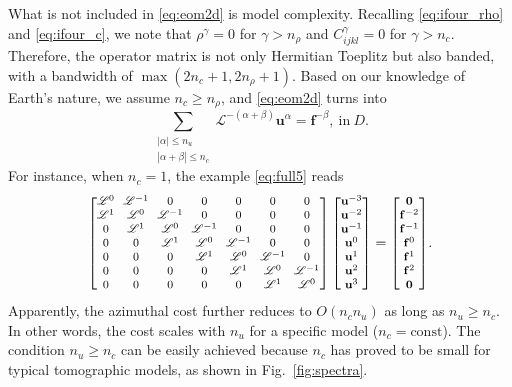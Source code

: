 \documentclass[extra,referee]{gji}
\begin{document}
What is not included in \eqref{eq:eom2d} is model complexity. 
Recalling \eqref{eq:ifour_rho} and \eqref{eq:ifour_c}, 
we note that $\rho^\gamma=0$ for $\gamma>n_\rho$ and 
$C_{ijkl}^\gamma=0$ for $\gamma>n_c$.
Therefore, the operator matrix is not only Hermitian Toeplitz 
but also banded, with a bandwidth of $\max\left(2n_c+1,2n_\rho+1\right)$. 
Based on our knowledge of Earth's nature, we assume $n_c\ge n_\rho$, 
and \eqref{eq:eom2d} turns into
\begin{equation}
  \sum_{\substack{|\alpha|\le n_u\\|\alpha+\beta|\le n_c}}
  \mathscr{L}^{-\left(\alpha+\beta\right)}\mathbf{u}^\alpha=\mathbf{f}^{-\beta},
  \ \text{in}\ D.
  \label{eq:band2d}
\end{equation}
For instance, when $n_c=1$, the example \eqref{eq:full5} reads
\begin{equation}
  {\footnotesize
  \setlength{\arraycolsep}{3pt}
  \begin{bmatrix}
  \mathscr{L}^{0} & \mathscr{L}^{-1} & 0 & 0 & 0 & 0 & 0\\
  \mathscr{L}^{1} & \mathscr{L}^{0} & \mathscr{L}^{-1} & 0 & 0 & 0 & 0\\
  0 & \mathscr{L}^{1} & \mathscr{L}^{0} & \mathscr{L}^{-1} & 0 & 0 & 0\\
  0 & 0 & \mathscr{L}^{1} & \mathscr{L}^{0} & \mathscr{L}^{-1} & 0 & 0\\
  0 & 0 & 0 & \mathscr{L}^{1} & \mathscr{L}^{0} & \mathscr{L}^{-1} & 0\\
  0 & 0 & 0 & 0 & \mathscr{L}^{1} & \mathscr{L}^{0} & \mathscr{L}^{-1}\\
  0 & 0 & 0 & 0 & 0 & \mathscr{L}^{1} & \mathscr{L}^{0}\\
  \end{bmatrix}\begin{bmatrix}
  \mathbf{u}^{-3}\\
  \mathbf{u}^{-2}\\
  \mathbf{u}^{-1}\\
  \mathbf{u}^{0}\\
  \mathbf{u}^{1}\\
  \mathbf{u}^{2}\\
  \mathbf{u}^{3}
  \end{bmatrix}=\begin{bmatrix}
  \mathbf{0}\\
  \mathbf{f}^{-2}\\
  \mathbf{f}^{-1}\\
  \mathbf{f}^{0}\\
  \mathbf{f}^{1}\\
  \mathbf{f}^{2}\\
  \mathbf{0}
  \end{bmatrix}}.
  \label{eq:band5}
\end{equation}
Apparently, the azimuthal cost further reduces to $O\left(n_c n_u\right)$ 
as long as $n_u \ge n_c$. In other words, the cost scales with $n_u$ 
for a specific model ($n_c=\text{const}$).
The condition $n_u \ge n_c$ can be easily achieved because $n_c$ has proved to
be small for typical tomographic models, as shown in Fig.~\ref{fig:spectra}. 
\end{document}
